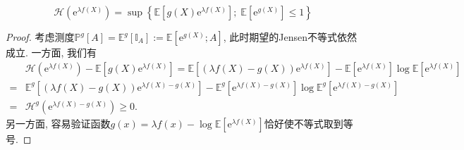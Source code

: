 \begin{theorem}[熵的变分表示]\label{thm:VariationalRepresentationForEntropy}
	\begin{equation}\label{eq:VariationalRepresentationForEntropy}
		\mathcal{H}(\mathrm{e}^{\lambda f(X)})
		= \sup \left\{ \mathbb{E}[g(X) \mathrm{e}^{\lambda f(X)}];\; \mathbb{E}[\mathrm{e}^{g(X)}] \leq 1 \right\}
	\end{equation}
\end{theorem}
\begin{proof}
	考虑测度$\mathbb{P}^g[A] = \mathbb{E}^g [\mathbb{I}_A] := \mathbb{E}[\mathrm{e}^{g(X)}; A]$, 此时期望的Jensen不等式依然成立. 
	一方面, 我们有
	\begin{align*}
		&\mathcal{H}(\mathrm{e}^{\lambda f(X)}) - \mathbb{E}[g(X) \mathrm{e}^{\lambda f(X)}]
		= \mathbb{E}\left[ (\lambda f(X) - g(X)) \mathrm{e}^{\lambda f(X)} \right] - \mathbb{E}[ \mathrm{e}^{\lambda f(X)}] \log \mathbb{E}[ \mathrm{e}^{\lambda f(X)}] \\
		=& \mathbb{E}^g  \left[ (\lambda f(X) - g(X)) \mathrm{e}^{\lambda f(X) - g(X)} \right] - \mathbb{E}^g[ \mathrm{e}^{\lambda f(X) - g(X)}] \log \mathbb{E}^g[ \mathrm{e}^{\lambda f(X) - g(X)}] \\
		=& \mathcal{H}^g(\mathrm{e}^{\lambda f(X) - g(X)}) \geq 0. 
	\end{align*}
	另一方面, 容易验证函数$g(x) = \lambda f(x) - \log \mathbb{E}[\mathrm{e}^{\lambda f(X)}]$恰好使不等式取到等号. 
\end{proof}

